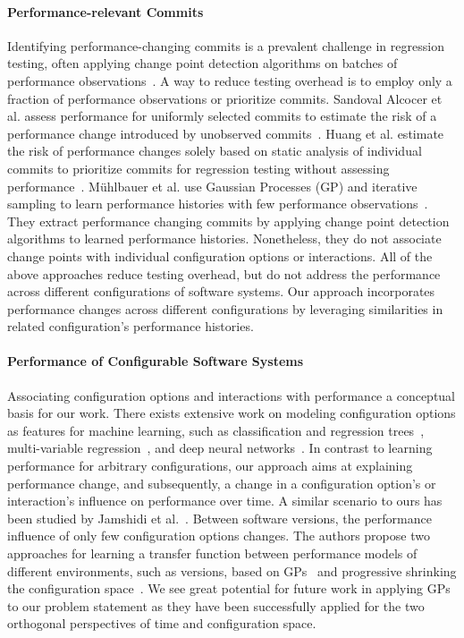 \documentclass[sigconf]{acmart}
\begin{document}
	\paragraph{Performance-relevant Commits} Identifying performance-changing commits is a prevalent challenge in regression testing, often applying change point detection algorithms on batches of performance observations~\cite{cityIdentifying2014,daly_industry_2020}. A way to reduce testing overhead is to employ only a fraction of performance observations or prioritize commits. Sandoval Alcocer et al. assess performance for uniformly selected commits to estimate the risk of a performance change introduced by unobserved commits~\cite{sandoval_alcocer_learning_2016,alcocer_prioritizing_2020}. Huang et al. estimate the risk of performance changes solely based on static analysis of individual commits to prioritize commits for regression testing without assessing performance~\cite{huang_performance_2014}. Mühlbauer et al. use Gaussian Processes (GP) and iterative sampling to learn performance histories with few performance observations~\cite{muhlbauer_accurate_2019}. They extract performance changing commits by applying change point detection algorithms to learned performance histories. Nonetheless, they do not associate change points with individual configuration options or interactions. All of the above approaches reduce testing overhead, but do not address the performance across different configurations of software systems. Our approach incorporates performance changes across different configurations by leveraging similarities in related configuration's performance histories.
	\paragraph{Performance of Configurable Software Systems} Associating configuration options and interactions with performance a conceptual basis for our work. There exists extensive work on modeling configuration options as features for machine learning, such as classification and regression trees~\cite{guoVariabilityawarePerformancePrediction2013,sarkarCostEfficientSamplingPerformance,nairUsingBadLearners2017}, multi-variable regression~\cite{siegmundPerformanceinfluenceModelsHighly2015}, and deep neural networks~\cite{haDeepPerf2019}. In contrast to learning performance for arbitrary configurations, our approach aims at explaining performance change, and subsequently, a change in a configuration option's or interaction's influence on performance over time. A similar scenario to ours has been studied by Jamshidi et al.~\cite{jamishidi_transfer_2017,jamshidi_transfer_gp_2017,jamshidi_learning_2018}. Between software versions, the performance influence of only few configuration options changes. The authors propose two approaches for learning a transfer function between performance models of different environments, such as versions, based on GPs~\cite{jamshidi_transfer_gp_2017} and progressive shrinking the configuration space~\cite{jamshidi_learning_2018}. We see great potential for future work in applying GPs to our problem statement as they have been successfully applied for the two orthogonal perspectives of time and configuration space.
	
\end{document}
